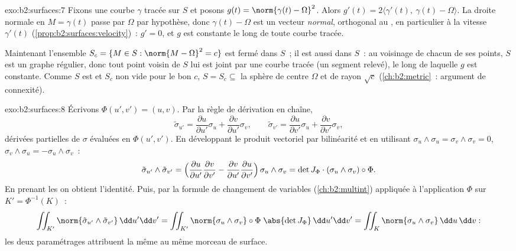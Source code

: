 \begin{solution}{exo:b2:surfaces:7}
Fixons une courbe $\gamma$ tracée sur $S$ et posons $g(t) = \norm{\gamma(t)
- \Omega}^2$. Alors $g'(t) = 2\langle \gamma'(t),\ \gamma(t) -
\Omega\rangle$. La droite normale en $M = \gamma(t)$ passe par
$\Omega$ par hypothèse, donc $\gamma(t) - \Omega$ est un vecteur \emph{normal},
orthogonal au , en particulier à la vitesse $\gamma'(t)$
(\cref{prop:b2:surfaces:velocity})~: $g' =
0$, et $g$ est constante le long de toute courbe tracée.

Maintenant l'ensemble $S_c = \{M \in S : \norm{M - \Omega}^2 = c\}$ est
fermé dans $S$~; il est aussi  dans $S$~: au voisinage de chacun de
ses points, $S$ est un graphe régulier, donc tout point voisin de $S$ lui
est joint par une courbe tracée (un segment relevé), le long de laquelle $g$
est constante. Comme $S$ est  et $S_c$ non vide pour le bon $c$, $S = S_c
\subseteq$ la sphère de centre $\Omega$ et de rayon $\sqrt c$
(\cref{ch:b2:metric}~: argument de connexité).
\end{solution}

\begin{solution}{exo:b2:surfaces:8}
Écrivons $\Phi(u', v') = (u, v)$. Par la règle de dérivation en chaîne,
\[
\tilde\sigma_{u'} = \frac{\partial u}{\partial u'}\sigma_u
+ \frac{\partial v}{\partial u'}\sigma_v,
\qquad
\tilde\sigma_{v'} = \frac{\partial u}{\partial v'}\sigma_u
+ \frac{\partial v}{\partial v'}\sigma_v ,
\]
dérivées partielles de $\sigma$ évaluées en $\Phi(u',v')$. En développant le
produit vectoriel par bilinéarité et en utilisant $\sigma_u \wedge \sigma_u =
\sigma_v \wedge \sigma_v = 0$, $\sigma_v \wedge \sigma_u =
-\sigma_u \wedge \sigma_v$~:
\[
\tilde\sigma_{u'} \wedge \tilde\sigma_{v'}
= \Bigl(\frac{\partial u}{\partial u'}
\frac{\partial v}{\partial v'}
- \frac{\partial v}{\partial u'}
\frac{\partial u}{\partial v'}\Bigr)\,
\sigma_u \wedge \sigma_v
= \det J_\Phi \cdot (\sigma_u \wedge \sigma_v)\circ\Phi .
\]
En prenant les  on obtient l'identité. Puis, par la formule de
changement de variables (\cref{ch:b2:multint}) appliquée à l'application
$\Phi$ sur $K' = \Phi^{-1}(K)$~:
\[
\iint_{K'} \norm{\tilde\sigma_{u'} \wedge \tilde\sigma_{v'}}
\,\dd u'\dd v'
= \iint_{K'} \norm{\sigma_u \wedge \sigma_v}\circ\Phi\;
\abs{\det J_\Phi}\,\dd u'\dd v'
= \iint_K \norm{\sigma_u \wedge \sigma_v}\,\dd u\,\dd v :
\]
les deux paramétrages attribuent la même  au même morceau de
surface.
\end{solution}

